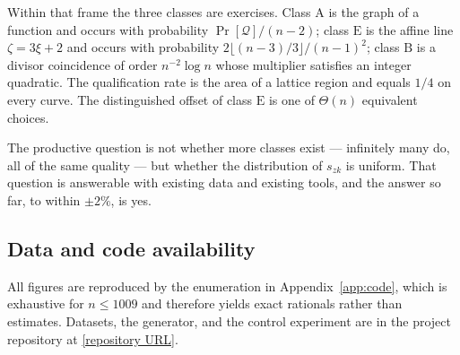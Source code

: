 \documentclass[11pt,a4paper]{article}
\theoremstyle{plain}
\theoremstyle{definition}
\theoremstyle{remark}
\newcommand{\Qu}{\mathcal{Q}}
\newcommand{\Pro}{\Pr}
\newcommand{\szk}{s_{zk}}
\newcommand{\clA}{\mathrm{A}}
\newcommand{\clB}{\mathrm{B}}
\newcommand{\clE}{\mathrm{E}}
\begin{document}
Within that frame the three classes are exercises. Class $\clA$ is the graph of a function and
occurs with probability $\Pro[\Qu]/(n-2)$; class $\clE$ is the affine line
$\zeta = 3\xi+2$ and occurs with probability $2\lfloor (n-3)/3\rfloor/(n-1)^{2}$; class $\clB$ is
a divisor coincidence of order $n^{-2}\log n$ whose multiplier satisfies an integer quadratic. The
qualification rate is the area of a lattice region and equals $1/4$ on every curve. The
distinguished offset of class $\clE$ is one of $\Theta(n)$ equivalent choices.

The productive question is not whether more classes exist --- infinitely many do, all of the same
quality --- but whether the distribution of $\szk$ is uniform. That question is answerable with
existing data and existing tools, and the answer so far, to within $\pm 2\%$, is yes.

\subsection*{Data and code availability}

All figures are reproduced by the enumeration in Appendix~\ref{app:code}, which is exhaustive for
$n \le 1009$ and therefore yields exact rationals rather than estimates. Datasets, the generator,
and the control experiment are in the project repository at \url{[repository URL]}.
\end{document}
